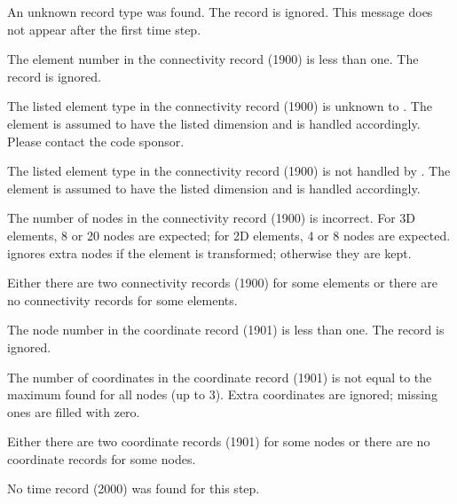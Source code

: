 {
An unknown record type was found. The record is ignored. This message
does not appear after the first time step.
}

{
The element number in the connectivity record (1900) is less than one.
The record is ignored.
}

{
The listed element type in the connectivity record (1900) is unknown to
\caps{\PROGRAM}. The element is assumed to have the listed dimension and
is handled accordingly. Please contact the code sponsor.
}

{
The listed element type in the connectivity record (1900) is not handled
by \caps{\PROGRAM}. The element is assumed to have the listed dimension
and is handled accordingly.
}

{
The number of nodes in the connectivity record (1900) is incorrect. For
3D elements, 8 or 20 nodes are expected; for 2D elements, 4 or 8 nodes
are expected. \caps{\PROGRAM} ignores extra nodes if the element is
transformed; otherwise they are kept.
}

{
Either there are two connectivity records (1900) for some elements or
there are no connectivity records for some elements.
}

{
The node number in the coordinate record (1901) is less than one. The
record is ignored.
}

{
The number of coordinates in the coordinate record (1901) is not equal
to the maximum found for all nodes (up to 3). Extra coordinates are
ignored; missing ones are filled with zero.
}

{
Either there are two coordinate records (1901) for some nodes or there
are no coordinate records for some nodes.
}

{
No time record (2000) was found for this step.
}


